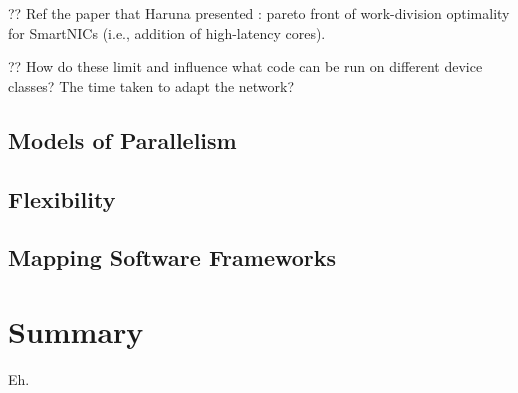 ?? Ref the paper that Haruna presented \parencite{DBLP:conf/icc/MafiolettikDMRV20}: pareto front of work-division optimality for SmartNICs (i.e., addition of high-latency cores).

?? How do these limit and influence what code can be run on different device classes? The time taken to adapt the network?

\subsection{Models of Parallelism}

\subsection{Flexibility}

\subsection{Mapping Software Frameworks}

\section{Summary}
Eh. 
